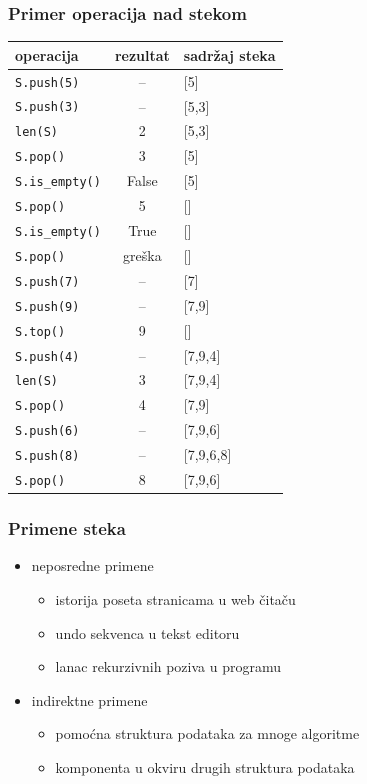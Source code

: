 \documentclass[compress]{beamer}
\begin{document}
\begin{frame}[fragile,shrink=10]
  \frametitle{Primer operacija nad stekom}
\begin{center}
\begin{tabular}{lcl}
\textbf{operacija} & \textbf{rezultat} & \textbf{sadržaj steka} \\
\hline \hline
\texttt{S.push(5)} & -- & [5] \\ 
\texttt{S.push(3)} & -- & [5,3] \\ 
\texttt{len(S)} & 2 & [5,3] \\ 
\texttt{S.pop()} & 3 & [5] \\ 
\texttt{S.is\_empty()} & False & [5] \\ 
\texttt{S.pop()} & 5 & [] \\ 
\texttt{S.is\_empty()} & True & [] \\ 
\texttt{S.pop()} & greška & [] \\ 
\texttt{S.push(7)} & -- & [7] \\ 
\texttt{S.push(9)} & -- & [7,9] \\ 
\texttt{S.top()} & 9 & [] \\ 
\texttt{S.push(4)} & -- & [7,9,4] \\ 
\texttt{len(S)} & 3 & [7,9,4] \\ 
\texttt{S.pop()} & 4 & [7,9] \\ 
\texttt{S.push(6)} & -- & [7,9,6] \\ 
\texttt{S.push(8)} & -- & [7,9,6,8] \\ 
\texttt{S.pop()} & 8 & [7,9,6] \\ 
\end{tabular}
\end{center}
\end{frame}

\begin{frame}[fragile]
  \frametitle{Primene steka}
  \begin{itemize}
    \item neposredne primene
    \begin{itemize}
      \item istorija poseta stranicama u web čitaču
      \item undo sekvenca u tekst editoru
      \item lanac rekurzivnih poziva u programu
    \end{itemize}
    \item indirektne primene
    \begin{itemize}
      \item pomoćna struktura podataka za mnoge algoritme
      \item komponenta u okviru drugih struktura podataka
    \end{itemize}
  \end{itemize}
\end{frame}
\end{document}
